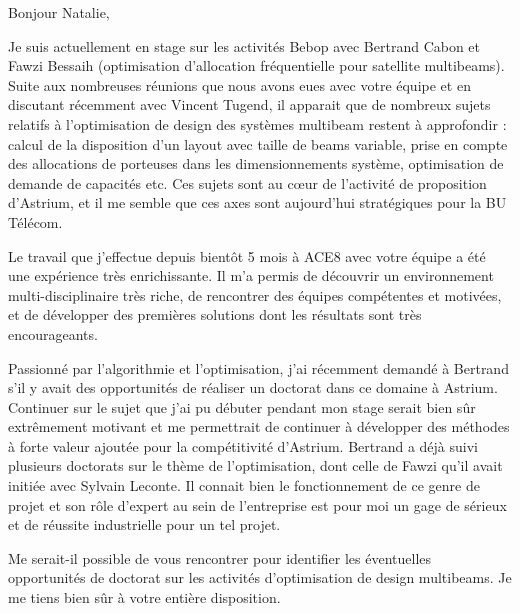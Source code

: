\documentclass[12pt]{lettre}
\begin{document}
\begin{letter}{}
\address{Victor Cameo Ponz\\47 rue Guynemer\\31200 Toulouse}
\nofax

\conc{}
\opening{Bonjour Natalie,}
Je suis actuellement en stage sur les activités Bebop avec Bertrand Cabon et Fawzi Bessaih
(optimisation d’allocation fréquentielle pour satellite multibeams).
Suite aux nombreuses réunions que nous avons eues avec votre équipe et en
discutant récemment avec Vincent Tugend,
il apparait que de nombreux sujets relatifs à l’optimisation de design des systèmes
multibeam restent à approfondir : calcul de la disposition d’un layout avec taille de beams variable,
prise en compte des allocations de porteuses dans les dimensionnements système,
optimisation de demande de capacités etc.
Ces sujets sont au cœur de l’activité de proposition d’Astrium,
et il me semble que ces axes sont aujourd’hui stratégiques pour la BU Télécom.

Le travail que j’effectue depuis bientôt 5 mois à ACE8 avec votre équipe a été une expérience très enrichissante. Il m’a permis de découvrir un environnement multi-disciplinaire très riche, de rencontrer des équipes compétentes et motivées, et de développer des premières solutions dont les résultats sont très encourageants.

Passionné par l’algorithmie et l’optimisation, j’ai récemment demandé à Bertrand s’il y avait des opportunités de réaliser un doctorat dans ce domaine à Astrium. Continuer sur le sujet que j’ai pu débuter pendant mon stage serait bien sûr extrêmement motivant et me permettrait de continuer à développer des méthodes à forte valeur ajoutée pour la compétitivité d’Astrium. Bertrand a déjà suivi plusieurs doctorats sur le thème de l’optimisation, dont celle de Fawzi qu’il avait initiée avec Sylvain Leconte. Il connait bien le fonctionnement de ce genre de projet et son rôle d’expert au sein de l’entreprise est pour moi un gage de sérieux et de réussite industrielle pour un tel projet.

Me serait-il possible de vous rencontrer pour identifier les éventuelles opportunités de doctorat sur les activités d’optimisation de design multibeams. Je me tiens bien sûr à votre entière disposition.

\closing{}
\end{letter}
\end{document}
